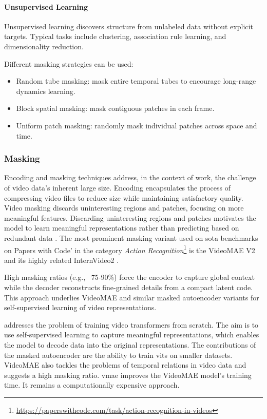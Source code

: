 \paragraph{Unsupervised Learning}
Unsupervised learning discovers structure from unlabeled data without explicit targets. Typical tasks include clustering, association rule learning, and dimensionality reduction. 

Different masking strategies can be used:
\begin{itemize}
    \item Random tube masking: mask entire temporal tubes to encourage long-range dynamics learning.
    \item Block spatial masking: mask contiguous patches in each frame.
    \item Uniform patch masking: randomly mask individual patches across space and time.
\end{itemize}

\subsubsection{Masking}

Encoding and masking techniques address, in the context of work, the challenge of video data's inherent large size. Encoding encapsulates the process of compressing video files to reduce size while maintaining satisfactory quality. Video masking discards uninteresting regions and patches, focusing on more meaningful features. Discarding uninteresting regions and patches motivates the model to learn meaningful representations rather than predicting based on redundant data \cite{tong_videomae_2022}. The most prominent masking variant used on \acrshort{sota} benchmarks on Papers with Code' in the category \textit{Action Recognition}\footnote{\url{https://paperswithcode.com/task/action-recognition-in-videos}} is the VideoMAE V2 \cite{wang_videomae_2023} and its highly related InternVideo2 \cite{wang_internvideo2_2024}. 

High masking ratios (e.g., \ 75-90\%) force the encoder to capture global context while the decoder reconstructs fine-grained details from a compact latent code. This approach underlies VideoMAE and similar masked autoencoder variants for self-supervised learning of video representations.

\textcite{tong_videomae_2022} addresses the problem of training video transformers from scratch. The aim is to use self-supervised learning to capture meaningful representations, which enables the model to decode data into the original representations. The contributions of the masked autoencoder \cite{tong_videomae_2022} are the ability to train \acrshort{vit}s on smaller datasets. VideoMAE \cite{tong_videomae_2022} also tackles the problems of temporal relations in video data and suggests a high masking ratio. \acrfull{vmae} \cite{wang_videomae_2023} improves the VideoMAE model's training time. It remains a computationally expensive approach. 


